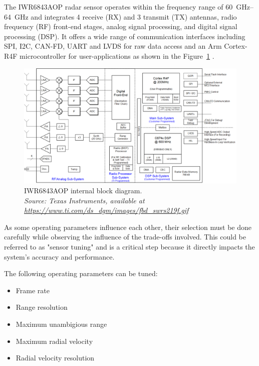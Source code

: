 \par
The IWR6843AOP radar sensor operates within the frequency range of \SIrange{60}{64}{\giga\hertz} and integrates 4 receive (RX) and 3 transmit (TX) antennas, radio frequency (RF) front-end stages, analog signal processing, and digital signal processing (DSP).
It offers a wide range of communication interfaces including SPI, I2C, CAN-FD, UART and LVDS for raw data access and an Arm Cortex-R4F microcontroller for user-applications as shown in the Figure~\ref{fig:IWR6843AOP_internal} \cite{dev_board_page}.

\begin{figure}[!htbp]
    \centering
    \includegraphics[width=1.0\linewidth]{images/blockdiagram.png}
    \caption{IWR6843AOP internal block diagram.\\
    \textit{Source: Texas Instruments, available at \url{https://www.ti.com/ds_dgm/images/fbd_swrs219f.gif}}}
    \label{fig:IWR6843AOP_internal}
\end{figure}

As some operating parameters influence each other, their selection must be done carefully while observing the influence of the trade-offs involved.
This could be referred to as "sensor tuning" and is a critical step because it directly impacts the system's accuracy and performance.

The following operating parameters can be tuned:
\begin{itemize}
    \item Frame rate
    \item Range resolution
    \item Maximum unambigious range
    \item Maximum radial velocity
    \item Radial velocity resolution
\end{itemize}

